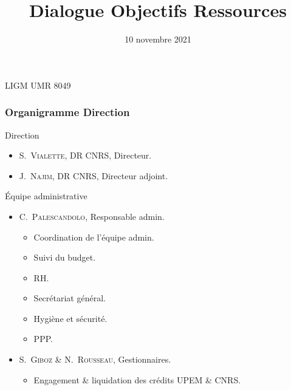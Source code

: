 \documentclass[]{beamer}
\title[DOR]{%
  \Large Dialogue Objectifs Ressources
}%
\institute[LIGM]{%
  \large {\bf Laboratoire d'Informatique Gaspard-Monge (LIGM)}
}
\date[10/11/21]{%
  10 novembre 2021
}%
\begin{document}

\begin{frame}
  \maketitle
\end{frame}


\begin{frame}[label=introduction, standout]{}
  LIGM UMR 8049
\end{frame}


\begin{frame}
  \frametitle{Organigramme Direction}

  \begin{block}{Direction}
    \begin{itemize}
      \item \textsc{S.~Vialette}, DR CNRS, Directeur.
      \item \textsc{J.~Najim}, DR CNRS, Directeur adjoint.
    \end{itemize}
  \end{block}

  \begin{block}{\'Equipe administrative}
    \begin{itemize}
      \item \textsc{C.~Palescandolo}, Responsable admin.
        \begin{itemize}
          \item Coordination de l'équipe admin.
          \item Suivi du budget.
          \item RH.
          \item Secrétariat général.
          \item Hygiène et sécurité.
          \item PPP.
        \end{itemize}

      \item \textsc{S.~Giboz} \& \textsc{N.~Rousseau}, Gestionnaires.
      \begin{itemize}
        \item Engagement \& liquidation des crédits UPEM \& CNRS.
      \end{itemize}
    \end{itemize}
  \end{block}

\end{frame}
\end{document}
